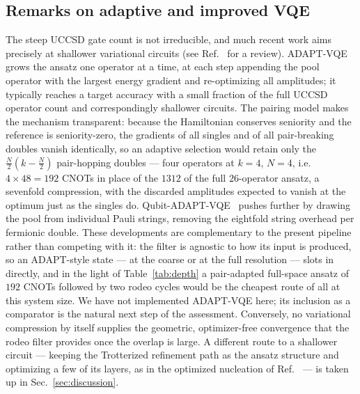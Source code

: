 \documentclass[
  aps,            %
  prc,            %
  reprint,        %
  superscriptaddress,
  floatfix,
  nofootinbib
]{revtex4-2}
\begin{document}
\subsection{Remarks on adaptive and improved VQE}
\label{sec:adapt}
The steep UCCSD gate count is not irreducible, and much recent work aims
precisely at shallower variational circuits (see Ref.~\cite{Tilly2022} for a
review).  ADAPT-VQE~\cite{Grimsley2019} grows the ansatz one operator at a
time, at each step appending the pool operator with the largest energy gradient
and re-optimizing all amplitudes; it typically reaches a target accuracy with a
small fraction of the full UCCSD operator count and correspondingly shallower
circuits.  The pairing model makes the mechanism transparent: because the
Hamiltonian conserves seniority and the reference is seniority-zero, the
gradients of all singles and of all pair-breaking doubles vanish identically,
so an adaptive selection would retain only the $\frac{N}{2}(k-\frac{N}{2})$
pair-hopping doubles --- four operators at $k=4$, $N=4$, i.e.\
$4\times48=192$ CNOTs in place of the $1312$ of the full $26$-operator ansatz,
a sevenfold compression, with the discarded amplitudes expected to vanish at
the optimum just as the singles do.  Qubit-ADAPT-VQE~\cite{Tang2021} pushes
further by drawing the pool from individual Pauli strings, removing the
eightfold string overhead per fermionic double.  These developments are
complementary to the present pipeline rather than competing with it: the
filter is agnostic to how its input is produced, so an ADAPT-style state
--- at the coarse or at the full resolution --- slots in directly, and in the
light of Table~\ref{tab:depth} a pair-adapted full-space ansatz of $192$ CNOTs
followed by two rodeo cycles would be the cheapest route of all at this system
size.  We have not implemented ADAPT-VQE here; its inclusion as a comparator is
the natural next step of the assessment.  Conversely, no variational
compression by itself supplies the geometric, optimizer-free convergence that
the rodeo filter provides once the overlap is large.  A different route to a
shallower circuit --- keeping the Trotterized refinement path as the ansatz
structure and optimizing a few of its layers, as in the optimized nucleation
of Ref.~\cite{Sadia2026} --- is taken up in Sec.~\ref{sec:discussion}.
\end{document}
